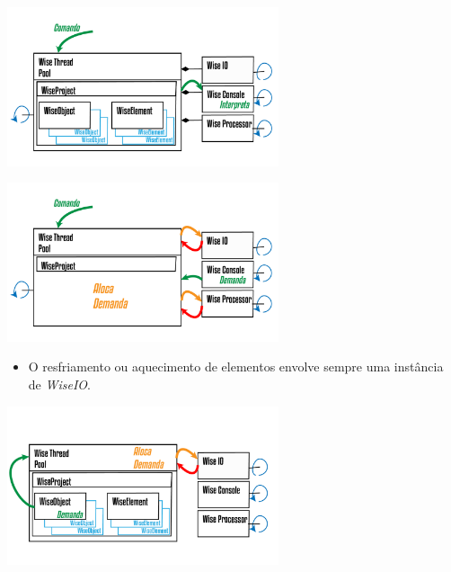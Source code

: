 \documentclass[10pt]{beamer}
\theoremstyle{remark}
\theoremstyle{definition}
\begin{document}
\begin{frame}[allowframebreaks]
		\begin{center}
			
			\item \includegraphics[width=0.6\textwidth]{images/WiseThreaPoolCMD.png}
			
		\end{center}
		
		\framebreak
		\begin{center}
			
			\item \includegraphics[width=0.6\textwidth]{images/WiseThreaPoolCMDSub.png}
			
		\end{center}
		
		\framebreak
		
		\begin{itemize}
				\item O resfriamento ou aquecimento de elementos envolve sempre uma instância de \textit{WiseIO}.
		\end{itemize}		
		
		\begin{center}
			
			\item \includegraphics[width=0.6\textwidth]{images/WiseThreadPoolHeating.png}
			

\end{center}
\end{frame}
\end{document}
